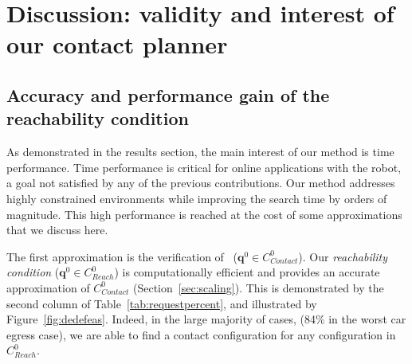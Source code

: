  \section{Discussion: validity and interest of our contact planner} 
\label{sec:discussion}

\subsection{Accuracy and performance gain of the reachability condition}

As demonstrated in the results section, the main interest of our method is time performance. Time performance is critical for 
online applications with the robot, a goal not satisfied by any of the previous contributions. Our method addresses highly constrained environments while improving the search time by orders of magnitude. This high performance is reached at the cost of some approximations that we discuss here. 

The first approximation is the verification of \contactreachability\ ($\mathbf{q}^0 \in C_{Contact}^0$).  Our \textit{reachability condition} ($\mathbf{q}^0 \in C_{Reach}^0$) is computationally efficient and provides an accurate approximation of $C_{Contact}^0$ (Section~\ref{sec:scaling}). This is demonstrated by the second column of Table~\ref{tab:requestpercent}, and illustrated by Figure~\ref{fig:dedefeas}. Indeed, in the large majority of cases, (84\% in the worst car egress case), we are able to find a contact configuration for any configuration in $C_{Reach}^0$.


